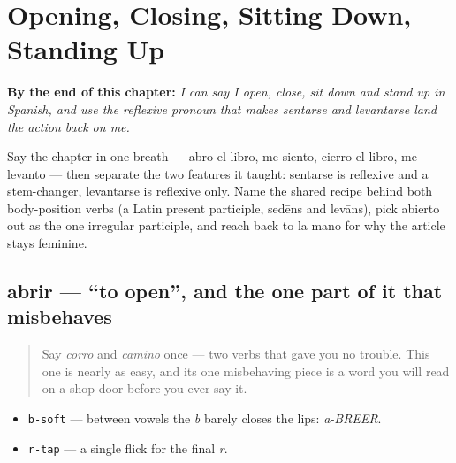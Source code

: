 
\chapter{Opening, Closing, Sitting Down, Standing Up}
\label{ch:spanish-open-close-sit-stand}

\begin{chapteropening}
\textbf{By the end of this chapter:} \emph{I can say I open, close, sit down and stand up in Spanish, and use the reflexive pronoun that makes sentarse and levantarse land the action back on me.}

Say the chapter in one breath — abro el libro, me siento, cierro el libro, me levanto — then separate the two features it taught: sentarse is reflexive and a stem-changer, levantarse is reflexive only. Name the shared recipe behind both body-position verbs (a Latin present participle, sedēns and levāns), pick abierto out as the one irregular participle, and reach back to la mano for why the article stays feminine.
\end{chapteropening}

\section[abrir]{abrir — \textquotedblleft{}to open\textquotedblright{}, and the one part of it that misbehaves}

\label{lesson:ES-C37-abrir}



\begin{quote}
Say \emph{corro} and \emph{camino} once — two verbs that gave you no trouble. This one is nearly as easy, and its one misbehaving piece is a word you will read on a shop door before you ever say it.
\end{quote}

\begin{sounds}
\begin{itemize}
\raggedright
  \item \texttt{b-soft} — between vowels the \emph{b} barely closes the lips: \emph{a-BREER}.
  \item \texttt{r-tap} — a single flick for the final \emph{r}.
\end{itemize}
\end{sounds}

